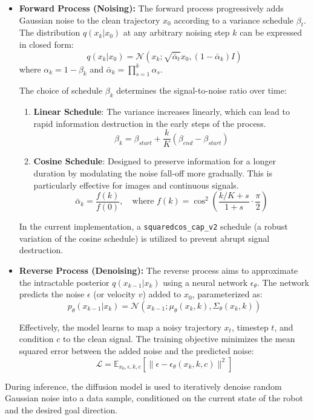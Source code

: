 \begin{itemize}
\item \textbf{Forward Process (Noising):} The forward process progressively
adds Gaussian noise to the clean trajectory \(x_0\) according to a
variance schedule \(\beta_t\). The distribution \(q(x_k | x_0)\) at any
arbitrary noising step \(k\) can be expressed in closed form:
\[ q(x_k | x_0) = \mathcal{N}(x_k; \sqrt{\bar{\alpha}_t} x_0, (1 - \bar{\alpha}_k) I) \]
where \(\alpha_k = 1 - \beta_k\) and
\(\bar{\alpha}_k = \prod_{s=1}^k \alpha_s\).

The choice of schedule \(\beta_k\) determines the signal-to-noise ratio
over time: 
\begin{enumerate}
\item 
\textbf{Linear Schedule}: The variance increases linearly,
which can lead to rapid information destruction in the early steps of
the process.
\[ \beta_k = \beta_{start} + \frac{k}{K}(\beta_{end} - \beta_{start}) \]
\item
\textbf{Cosine Schedule}: Designed to preserve information for a
longer duration by modulating the noise fall-off more gradually. This is
particularly effective for images and continuous signals.
\[ \bar{\alpha}_k = \frac{f(k)}{f(0)}, \quad \text{where } f(k) = \cos^2\left(\frac{k/K + s}{1+s} \cdot \frac{\pi}{2}\right) \]
\end{enumerate}

In the current implementation, a \texttt{squaredcos\_cap\_v2} schedule
(a robust variation of the cosine schedule) is utilized to prevent
abrupt signal destruction.

\item 
\textbf{Reverse Process (Denoising):} The reverse process aims to
approximate the intractable posterior \(q(x_{k-1} | x_k)\) using a
neural network \(\epsilon_\theta\). The network predicts the noise
\(\epsilon\) (or velocity \(v\)) added to \(x_0\), parameterized as:
\[ p_\theta(x_{k-1} | x_k) = \mathcal{N}(x_{k-1}; \mu_\theta(x_k, k), \Sigma_\theta(x_k, k)) \]

Effectively, the model learns to map a noisy trajectory \(x_t\),
timestep \(t\), and condition \(c\) to the clean signal. The training
objective minimizes the mean squared error between the added noise and
the predicted noise:
\[ \mathcal{L} = \mathbb{E}_{x_0, \epsilon, k, c} \left[ \| \epsilon - \epsilon_\theta(x_k, k, c) \|^2 \right] \]

\end{itemize}

During inference, the diffusion model is used to iteratively denoise random Gaussian noise into a data sample, conditioned on the current state of the robot and the desired goal direction.

